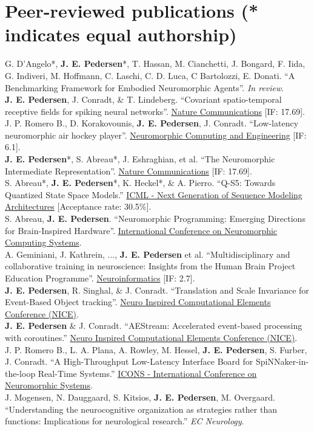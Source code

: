 \documentclass[11pt, a4paper]{article}
\newcommand{\years}[1]{\marginnote{\scriptsize #1}}
\begin{document}
\section*{Peer-reviewed publications {\small (* indicates equal authorship)}}
\years{2025}G. D'Angelo*, \textbf{J. E. Pedersen}*, T. Hassan, M. Cianchetti, J. Bongard, F. Iida, G. Indiveri, M. Hoffmann, C. Laschi, C. D. Luca, C Bartolozzi, E. Donati. ``A Benchmarking Framework for Embodied Neuromorphic Agents''. \textit{In review}. \\
\years{2025}\textbf{J. E. Pedersen}, J. Conradt, \& T. Lindeberg. ``Covariant spatio-temporal receptive fields for spiking neural networks''. \href{https://www.nature.com/ncomms/}{Nature Communications} [IF: 17.69]. \\
\years{2025}J. P. Romero B., D. Korakovounis, \textbf{J. E. Pedersen}, J. Conradt. ``Low-latency neuromorphic air hockey player''. \href{https://iopscience.iop.org/journal/2634-4386}{Neuromorphic Computing and Engineering} [IF: 6.1]. \\
\years{2024}\textbf{J. E. Pedersen}*, S. Abreau*, J. Eshraghian, et al. ``The Neuromorphic Intermediate Representation''.
\href{https://www.nature.com/ncomms/}{Nature Communications} [IF: 17.69]. \\
\years{2024} S. Abreau*, \textbf{J. E. Pedersen}*, K. Heckel*, \& A. Pierro. ``Q-S5: Towards Quantized State Space Models.''
\href{https://icml.cc/virtual/2024/workshop/29962}{ICML - Next Generation of Sequence Modeling Architectures} [Acceptance rate: 30.5\%]. \\
\years{2024} S. Abreau, \textbf{J. E. Pedersen}.
``Neuromorphic Programming: Emerging Directions for Brain-Inspired Hardware''.
\href{https://iconsneuromorphic.cc/}{International Conference on Neuromorphic Computing Systems}. \\
\years{2024} A. Geminiani, J. Kathrein, ..., \textbf{J. E. Pedersen} et al. ``Multidisciplinary and collaborative training in neuroscience: Insights from the Human Brain Project Education Programme''. \href{https://link.springer.com/journal/12021}{Neuroinformatics} [IF: 2.7]. \\
\years{2023} \textbf{J. E. Pedersen}, R. Singhal, \& J. Conradt.
``Translation and Scale Invariance for Event-Based Object tracking''.
\href{https://niceworkshop.org/}{Neuro Inspired Computational Elements Conference (NICE)}. \\
\years{2023} \textbf{J. E. Pedersen} \& J. Conradt.
``AEStream: Accelerated event-based processing with coroutines.''
\href{https://niceworkshop.org/}{Neuro Inspired Computational Elements Conference (NICE)}. \\
\years{2023} J. P. Romero B., L. A. Plana, A. Rowley, M. Hessel, \textbf{J. E. Pedersen}, S. Furber, J. Conradt.
``A High-Throughput Low-Latency Interface Board for SpiNNaker-in-the-loop Real-Time Systems.''
\href{https://icons.ornl.gov/}{ICONS - International Conference on Neuromorphic Systems}. \\
\years{2018} J. Mogensen, N. Dauggaard, S. Kitsios, \textbf{J. E. Pedersen}, M. Overgaard.
``Understanding the neurocognitive organization as strategies rather than functions: Implications for neurological research.''
\emph{EC Neurology}.
\end{document}
